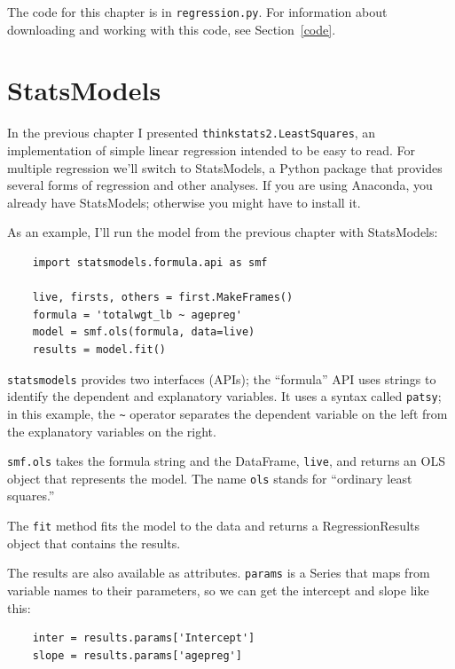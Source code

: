 \documentclass[12pt]{book}
\theoremstyle{exercise}
\begin{document}
The code for this chapter is in {\tt regression.py}.  For information
about downloading and working with this code, see Section~\ref{code}.

\section{StatsModels}%
\label{statsmodels}

In the previous chapter I presented {\tt thinkstats2.LeastSquares}, an
implementation of simple linear regression intended to be easy to
read.  For multiple regression we'll switch to StatsModels, a Python
package that provides several forms of regression and other
analyses.  If you are using Anaconda, you already have StatsModels;
otherwise you might have to install it.%

As an example, I'll run the model from the previous chapter with
StatsModels:%
%

\begin{verbatim}
    import statsmodels.formula.api as smf

    live, firsts, others = first.MakeFrames()
    formula = 'totalwgt_lb ~ agepreg'
    model = smf.ols(formula, data=live)
    results = model.fit()
\end{verbatim}

{\tt statsmodels} provides two interfaces (APIs); the ``formula''
API uses strings to identify the dependent and explanatory variables.
It uses a syntax called {\tt patsy}; in this example, the \verb"~"
operator separates the dependent variable on the left from the
explanatory variables on the right.%
%
%

{\tt smf.ols} takes the formula string and the DataFrame, {\tt live},
and returns an OLS object that represents the model.  The name {\tt ols}
stands for ``ordinary least squares.''%
%
%

The {\tt fit} method fits the model to the data and returns a
RegressionResults object that contains the results.%

The results are also available as attributes.  {\tt params}
is a Series that maps from variable names to their parameters, so we can
get the intercept and slope like this:%

\begin{verbatim}
    inter = results.params['Intercept']
    slope = results.params['agepreg']
\end{verbatim}
\end{document}
